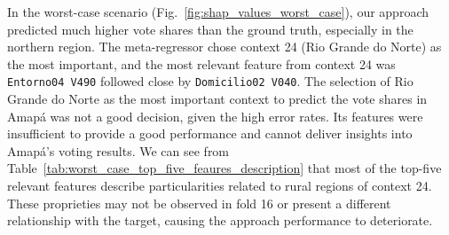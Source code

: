 \documentclass[runningheads]{llncs}
\begin{document}
\begin{table}[htbp]
	\centering
	\scriptsize
	\caption{Top-five features from the most important context in the best-case scenario~(fold 23).}
	\label{tab:best_case_top_five_feaures_description}
\end{table}

In the worst-case scenario (Fig.~\ref{fig:shap_values_worst_case}), our approach predicted much higher vote shares than the ground truth, especially in the northern region. The meta-regressor chose context 24 (Rio Grande do Norte) as the most important, and the most relevant feature from context 24 was \texttt{Entorno04 V490} followed close by \texttt{Domicilio02 V040}. The selection of Rio Grande do Norte as the most important context to predict the vote shares in Amapá was not a good decision, given the high error rates. Its features were insufficient to provide a good performance and cannot deliver insights into Amapá's voting results. We can see from Table~\ref{tab:worst_case_top_five_feaures_description} that most of the top-five relevant features describe particularities related to rural regions of context 24. These proprieties may not be observed in fold 16 or present a different relationship with the target, causing the approach performance to deteriorate. %
\end{document}
